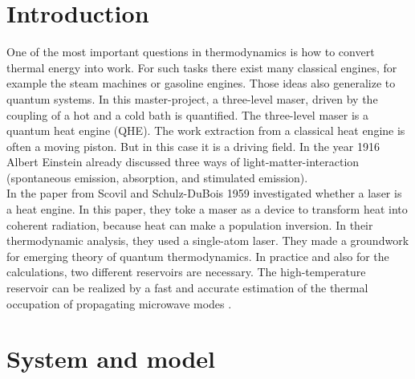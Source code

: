 \documentclass[12pt,a4paper]{article}
\begin{document}
\section{Introduction}
One of the most important questions in thermodynamics is how to convert
thermal energy into work. For such tasks there exist many classical engines, for
example the steam machines or gasoline engines. %
Those ideas also generalize to quantum systems.
In this master-project, a three-level maser, driven by the coupling of a hot and a cold bath is quantified.
The three-level maser is a quantum heat engine (QHE). The work extraction from a classical heat engine is often a moving piston. But in this case
it is a driving field. In the year 1916 Albert Einstein already discussed three ways of
light-matter-interaction (spontaneous emission, absorption, and stimulated
emission)\cite{Li2017}. \\In the paper from  Scovil and Schulz-DuBois 1959 \cite{Scovil1959} investigated whether a laser is a heat engine. In this paper, they toke a maser as a device to transform heat into coherent radiation, because heat can make a population inversion.
In their thermodynamic analysis, they used a single-atom laser. They made a
groundwork for emerging theory of quantum thermodynamics. In practice and also for the calculations, two different reservoirs are necessary. The high-temperature reservoir can be
realized by a fast and accurate
estimation of the thermal occupation of propagating microwave modes  \cite{Scigliuzzo2020}.

\newpage

\section{System and model}
\end{document}

